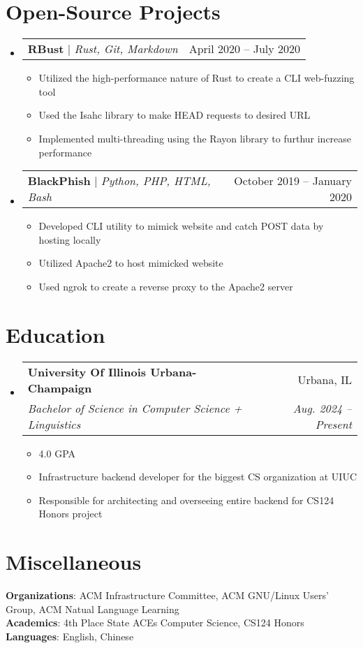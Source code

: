 \documentclass[letterpaper,11pt]{article}
\makeatletter
\newcommand{\resumeItem}[1]{
  \item\small{
    {#1 \vspace{-2pt}}
  }
}
\newcommand{\resumeSubheading}[4]{
  \vspace{-2pt}\item
    \begin{tabular*}{0.97\textwidth}[t]{l@{\extracolsep{\fill}}r}
      \textbf{#1} & #2 \\
      \textit{\small#3} & \textit{\small #4} \\
    \end{tabular*}\vspace{-7pt}
}
\newcommand{\resumeProjectHeading}[2]{
    \item
    \begin{tabular*}{0.97\textwidth}{l@{\extracolsep{\fill}}r}
      \small#1 & #2 \\
    \end{tabular*}\vspace{-7pt}
}
\newcommand{\resumeSubHeadingListStart}{\begin{itemize}[leftmargin=0.15in, label={}]}
\newcommand{\resumeSubHeadingListEnd}{\end{itemize}}
\newcommand{\resumeItemListStart}{\begin{itemize}}
\newcommand{\resumeItemListEnd}{\end{itemize}\vspace{-5pt}}
\makeatother
\begin{document}
\section{Open-Source Projects}
    \resumeSubHeadingListStart
      \resumeProjectHeading
          {\textbf{RBust} $|$ \emph{Rust, Git, Markdown}}{April 2020 -- July 2020}
          \resumeItemListStart
            \resumeItem{Utilized the high-performance nature of Rust to create a CLI web-fuzzing tool}
            \resumeItem{Used the Isahc library to make HEAD requests to desired URL}
            \resumeItem{Implemented multi-threading using the Rayon library to furthur increase performance}
          \resumeItemListEnd
      \resumeProjectHeading
          {\textbf{BlackPhish} $|$ \emph{Python, PHP, HTML, Bash}}{October 2019 -- January 2020}
          \resumeItemListStart
            \resumeItem{Developed CLI utility to mimick website and catch POST data by hosting locally}
            \resumeItem{Utilized Apache2 to host mimicked website}
            \resumeItem{Used ngrok to create a reverse proxy to the Apache2 server}
          \resumeItemListEnd
    \resumeSubHeadingListEnd

\section{Education}
  \resumeSubHeadingListStart
    \resumeSubheading
      {University Of Illinois Urbana-Champaign}{Urbana, IL}
      {Bachelor of Science in Computer Science + Linguistics}{Aug. 2024 -- Present}
      \resumeItemListStart
        \resumeItem{4.0 GPA}
        \resumeItem{Infrastructure backend developer for the biggest CS organization at UIUC}
        \resumeItem{Responsible for architecting and overseeing entire backend for CS124 Honors project}
      \resumeItemListEnd
        
  \resumeSubHeadingListEnd

\section{Miscellaneous}
 \begin{itemize}[leftmargin=0.15in, label={}]
    \small{\item{
     \textbf{Organizations}{: ACM Infrastructure Committee, ACM GNU/Linux Users' Group, ACM Natual Language Learning} \\
     \textbf{Academics}{: 4th Place State ACEs Computer Science, CS124 Honors} \\
     \textbf{Languages}{: English, Chinese} \\
    }}
 \end{itemize}

\end{document}
